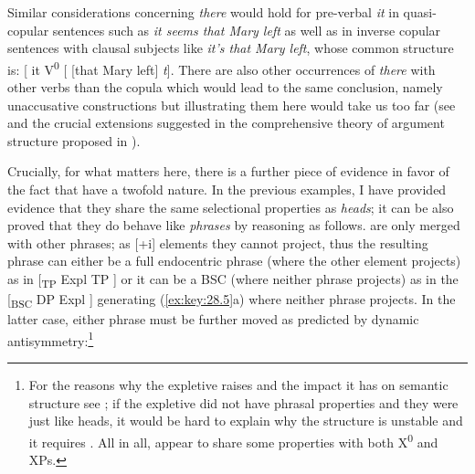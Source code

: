 \documentclass[output=paper]{langsci/langscibook}
\begin{document}
Similar considerations concerning \emph{there} would hold for pre-verbal
\emph{it} in quasi-copular sentences such as \emph{it seems that Mary left} as
well as in inverse copular sentences with clausal subjects like \emph{it's that
Mary left}, whose common structure is: [ it V\textsuperscript{0} [ [that Mary
left] \emph{t}]. There are also other occurrences of \emph{there} with other
verbs than the copula which would lead to the same conclusion, namely
unaccusative constructions but illustrating them here would take us too far
(see \citealt{Moro1997} and the crucial extensions suggested in the
comprehensive theory of argument structure proposed in
\citealt{HaleKeyser2002}).

Crucially, for what matters here, there is a further piece of evidence in favor
of the fact that  have a twofold nature. In the previous examples, I
have provided evidence that they share the same selectional properties as
\emph{heads}; it can be also proved that they do behave like \emph{phrases} by
reasoning as follows.  are only merged with other phrases; as [+i]
elements they cannot project, thus the resulting phrase can either be a full
endocentric phrase (where the other element projects) as in [\textsubscript{TP}
Expl TP ] or it can be a \gls{BSC} (where neither phrase projects) as in the
[\textsubscript{BSC} DP Expl ] generating (\ref{ex:key:28.5}a) where neither
phrase projects. In the latter case, either phrase must be further moved as
predicted by dynamic antisymmetry\@:\footnote{For the reasons why the expletive
    raises and the impact it has on semantic structure see
    \textcites[Ch.\ 3]{Moro1997}{Moro2000}{Moro2009};
    \citet{Chomsky2013,Chomsky2017,ChoGalOtt2019,Rizzi2015,Rizzi2016}
    if the expletive did not have phrasal properties and they were just like
    heads, it would be hard to explain why the structure is unstable and it
requires . All in all,  appear to share some properties with
both X\textsuperscript{0} and XPs.}
\end{document}
